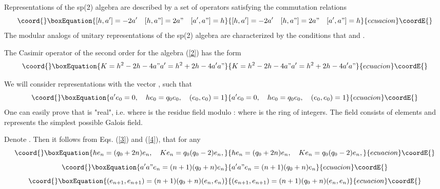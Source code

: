 \documentclass[a4paper,12pt]{article}%
\begin{document}
Representations of the sp(2) algebra are described by a
set of operators \coordHE{} satisfying the 
commutation relations 
\begin{equation}\coord{}\boxEquation{
[h,a']=-2a'\quad [h,a"]=2a"\quad [a',a"]=h
\label{2}
}{
[h,a']=-2a'\quad [h,a"]=2a"\quad [a',a"]=h
}{ecuacion}\coordE{}\end{equation} 
The modular analogs of unitary representations of the
sp(2) algebra are characterized
by the conditions that \coordHE{} and \coordHE{}. 

The  Casimir operator of the second order for the algebra
(\ref{2}) has the form
\begin{equation}\coord{}\boxEquation{
K=h^2-2h-4a"a'=h^2+2h-4a'a"
\label{3}
}{
K=h^2-2h-4a"a'=h^2+2h-4a'a"
}{ecuacion}\coordE{}\end{equation}

We will consider representations with the vector \coordHE{}, such that
\begin{equation}\coord{}\boxEquation{
a'e_0=0,\quad he_0=q_0e_0,\quad (e_0,e_0)=1 
\label{4}
}{
a'e_0=0,\quad he_0=q_0e_0,\quad (e_0,e_0)=1 
}{ecuacion}\coordE{}\end{equation} 
One can easily prove \cite{lev1,lev2} that \coordHE{} is
"real", i.e. \coordHE{} where \coordHE{} is the residue field
modulo \coordHE{}: \coordHE{} where \coordHE{} is the ring of integers.
The field \coordHE{} consists of \coordHE{} elements and represents the
simplest possible Galois field.

Denote \coordHE{}.
Then it follows from Eqs. (\ref{3}) and (\ref{4}),
that for any \coordHE{}
\begin{equation}\coord{}\boxEquation{
he_n=(q_0+2n)e_n,\quad Ke_n=q_0(q_0-2)e_n, 
\label{5}
}{
he_n=(q_0+2n)e_n,\quad Ke_n=q_0(q_0-2)e_n, 
}{ecuacion}\coordE{}\end{equation} 
\begin{equation}\coord{}\boxEquation{
a'a"e_n=(n+1)(q_0+n)e_n
\label{6}
}{
a'a"e_n=(n+1)(q_0+n)e_n
}{ecuacion}\coordE{}\end{equation}
\begin{equation}\coord{}\boxEquation{
(e_{n+1},e_{n+1})=(n+1)(q_0+n)(e_n,e_n)
\label{7}
}{
(e_{n+1},e_{n+1})=(n+1)(q_0+n)(e_n,e_n)
}{ecuacion}\coordE{}\end{equation}
\end{document}
